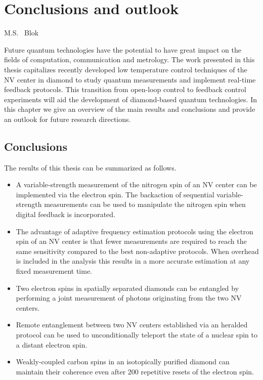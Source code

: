 \graphicspath{{./ch_conclusion_and_outlook/figures/}}

\chapter{Conclusions and outlook}
\label{ch:conclusion}

\begin{center} 
    \vspace{-1cm} {M.S. ~Blok} 
\end{center}

Future quantum technologies have the potential to have great impact on the fields of computation, communication and metrology. The work presented in this thesis capitalizes recently developed low temperature control techniques of the NV center in diamond to study quantum measurements and implement real-time feedback protocols. This transition from open-loop control to feedback control experiments will aid the development of diamond-based quantum technologies. In this chapter we give an overview of the main results and conclusions and provide an outlook for future research directions.
\clearpage

\section{Conclusions}
The results of this thesis can be summarized as follows.
\begin{itemize}

  \item A variable-strength measurement of the nitrogen spin of an NV center can be implemented via the electron spin. The backaction of sequential variable-strength measurements can be used to manipulate the nitrogen spin when digital feedback is incorporated.

  \item The advantage of adaptive frequency estimation protocols using the electron spin of an NV center is that fewer measurements are required to reach the same sensitivity compared to the best non-adaptive protocols. When overhead is included in the analysis this results in a more accurate estimation at any fixed measurement time.

  \item Two electron spins in spatially separated diamonds can be entangled by performing a joint measurement of photons originating from the two NV centers. 

  \item Remote entanglement between two NV centers established via an heralded protocol can be used to unconditionally teleport the state of a nuclear spin to a distant electron spin.

  \item Weakly-coupled carbon spins in an isotopically purified diamond can maintain their coherence even after 200 repetitive resets of the electron spin.
  
\end{itemize}

